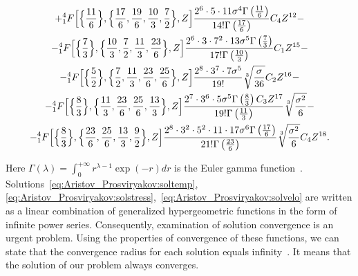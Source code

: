 \begin{multline}
+{^{4}_{1}F} \Bigl[\Bigl\{\frac{11}{6} \Bigr\},\Bigl\{\frac{17}{6},\frac{19}{6}, \frac{10}{3}, \frac{7}{2} \Bigr\},Z\Bigr] \frac{2^6\cdot 5\cdot 11\sigma^4 \Gamma\left(\frac{11}{6}\right)} {14! \Gamma\left(\frac{17}{6}\right)} C_4 Z^{12}-

\\

-{^{4}_{1}F} \Bigl[\Bigl\{\frac{7}{3} \Bigr\},\Bigl\{\frac{10}{3},\frac{7}{2}, \frac{11}{3}, \frac{23}{6} \Bigr\},Z\Bigr] \frac{2^6\cdot 3\cdot 7^2\cdot 13\sigma^5 \Gamma\left(\frac{7}{3}\right)} {17! \Gamma\left(\frac{10}{3}\right)} C_1 Z^{15}-

\\

-{^{4}_{1}F} \Bigl[\Bigl\{\frac{5}{2} \Bigr\},\Bigl\{\frac{7}{2},\frac{11}{3}, \frac{23}{6}, \frac{25}{6} \Bigr\},Z\Bigr] \frac{2^8\cdot 3^7\cdot 7\sigma^5 } {19!} \sqrt[3]{\frac{\sigma}{36}} C_2 Z^{16}-

\\

-{^{4}_{1}F} \Bigl[\Bigl\{\frac{8}{3} \Bigr\},\Bigl\{\frac{11}{3},\frac{23}{6}, \frac{25}{6}, \frac{13}{3} \Bigr\},Z\Bigr] \frac{2^7\cdot 3^6\cdot 5\sigma^5 \Gamma\left(\frac{8}{3}\right)C_3 Z^{17}} {19! \Gamma\left(\frac{11}{3}\right)} \sqrt[3]{\frac{\sigma^2}{6}} -

\\

-{^{4}_{1}F} \Bigl[\Bigl\{\frac{8}{3} \Bigr\},\Bigl\{\frac{23}{6},\frac{25}{6}, \frac{13}{3}, \frac{9}{2} \Bigr\},Z\Bigr] \frac{2^8\cdot 3^2\cdot 5^2\cdot 11\cdot 17\sigma^6 \Gamma\left(\frac{17}{6}\right)} {21! \Gamma\left(\frac{23}{6}\right)} \sqrt[3]{\frac{\sigma^2}{6}} C_4 Z^{18}.

\end{multline}

Here $\Gamma\left(\lambda\right)= \displaystyle\int_{0}^{+\infty}r^{\lambda-1}\exp\left(-r\right)dr$ is the Euler gamma function~\cite{ulg:bib:Polyanin}. Solutions~\eqref{eq:Aristov_Prosviryakov:soltemp}, \eqref{eq:Aristov_Prosviryakov:solstress},~\eqref{eq:Aristov_Prosviryakov:solvelo} are written as a linear  combination of generalized hypergeometric functions in the form of infinite power series. Consequently, examination of solution convergence is an urgent problem. Using the properties of convergence of these functions, we can state that the convergence radius for each solution equals infinity~\cite{ulg:bib:Polyanin}. It means that the solution of our problem always converges.



